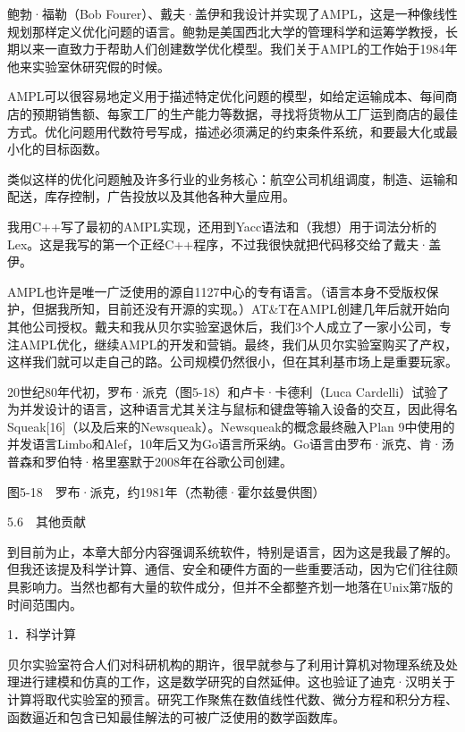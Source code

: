 \documentclass[a4paper,12pt,UTF8,twoside]{ctexbook}
\begin{document}
鲍勃·福勒（Bob Fourer）、戴夫·盖伊和我设计并实现了AMPL，这是一种像线性规划那样定义优化问题的语言。鲍勃是美国西北大学的管理科学和运筹学教授，长期以来一直致力于帮助人们创建数学优化模型。我们关于AMPL的工作始于1984年他来实验室休研究假的时候。

AMPL可以很容易地定义用于描述特定优化问题的模型，如给定运输成本、每间商店的预期销售额、每家工厂的生产能力等数据，寻找将货物从工厂运到商店的最佳方式。优化问题用代数符号写成，描述必须满足的约束条件系统，和要最大化或最小化的目标函数。

类似这样的优化问题触及许多行业的业务核心：航空公司机组调度，制造、运输和配送，库存控制，广告投放以及其他各种大量应用。

我用C++写了最初的AMPL实现，还用到Yacc语法和（我想）用于词法分析的Lex。这是我写的第一个正经C++程序，不过我很快就把代码移交给了戴夫·盖伊。

AMPL也许是唯一广泛使用的源自1127中心的专有语言。（语言本身不受版权保护，但据我所知，目前还没有开源的实现。）AT\&T在AMPL创建几年后就开始向其他公司授权。戴夫和我从贝尔实验室退休后，我们3个人成立了一家小公司，专注AMPL优化，继续AMPL的开发和营销。最终，我们从贝尔实验室购买了产权，这样我们就可以走自己的路。公司规模仍然很小，但在其利基市场上是重要玩家。

20世纪80年代初，罗布·派克（图5-18）和卢卡·卡德利（Luca Cardelli）试验了为并发设计的语言，这种语言尤其关注与鼠标和键盘等输入设备的交互，因此得名Squeak[16]（以及后来的Newsqueak）。Newsqueak的概念最终融入Plan 9中使用的并发语言Limbo和Alef，10年后又为Go语言所采纳。Go语言由罗布·派克、肯·汤普森和罗伯特·格里塞默于2008年在谷歌公司创建。



图5-18　罗布·派克，约1981年（杰勒德·霍尔兹曼供图）





5.6　其他贡献


到目前为止，本章大部分内容强调系统软件，特别是语言，因为这是我最了解的。但我还该提及科学计算、通信、安全和硬件方面的一些重要活动，因为它们往往颇具影响力。当然也都有大量的软件成分，但并不全都整齐划一地落在Unix第7版的时间范围内。





1．科学计算


贝尔实验室符合人们对科研机构的期许，很早就参与了利用计算机对物理系统及处理进行建模和仿真的工作，这是数学研究的自然延伸。这也验证了迪克·汉明关于计算将取代实验室的预言。研究工作聚焦在数值线性代数、微分方程和积分方程、函数逼近和包含已知最佳解法的可被广泛使用的数学函数库。
\end{document}
